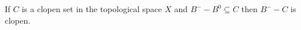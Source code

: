If $C$ is a clopen set in the topological space $X$ and $B^- - B^0 \subseteq C$ then $B^- - C$ is clopen.
